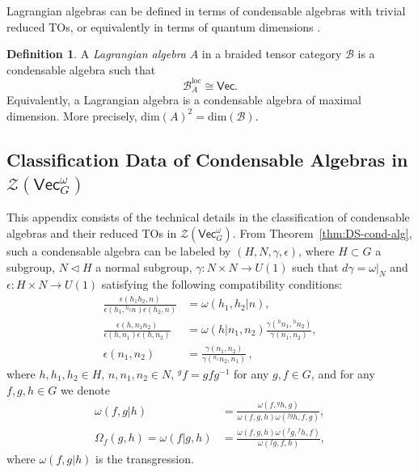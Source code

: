 \documentclass[aps,twocolumn,prx,floatfix,preprintnumbers, nofootinbib,10pt]{revtex4-2}
\numberwithin{equation}{section}
\theoremstyle{definition}
\newtheorem{definition}[theorem]{Definition}
\newcommand{\cB}{\mathcal{B}}
\newcommand{\cZ}{\mathcal{Z}}
\renewcommand{\Vec}{\mathsf{Vec}}
\renewcommand{\dim}{\text{dim}}
\newcommand{\Vect}{\mathsf{Vec}}
\begin{document}
Lagrangian algebras can be defined in terms of condensable algebras with trivial reduced TOs, or equivalently in terms of quantum dimensions \cite{davydov2013witt}.
\begin{definition}
\label{defn:Lagalg}
    A \emph{Lagrangian algebra} $A$ in a braided tensor category $\cB$ is a condensable algebra such that 
    \begin{equation}
        \cB^\text{loc}_{A} \cong \Vect.
    \end{equation}
    Equivalently, a Lagrangian algebra is a condensable algebra of maximal dimension. More precisely, $\dim(A)^2=\dim(\cB)$.
\end{definition}


\subsection{Classification Data of Condensable Algebras in $\cZ(\Vec_G^\omega)$}
This appendix consists of the technical details in the classification of condensable algebras and their reduced TOs in $\cZ(\Vec_G^\omega)$. From Theorem~\ref{thm:DS-cond-alg}, such a condensable algebra can be labeled by $(H, N, \gamma, \epsilon)$, where $H\subset G$ a subgroup, $N\triangleleft H$ a normal subgroup, $\gamma:N\times N \rightarrow U(1)$ such that $d\gamma=\omega|_N$ and $\epsilon:H \times N \rightarrow U(1)$ satisfying the following compatibility conditions:
    \begin{align}
        \frac{\epsilon(h_1h_2,n)}{\epsilon(h_1,{}^{h_2}n)\epsilon(h_2,n)}&=\omega(h_1,h_2|n), \label{eqn:epsilon_relation_transgression}\\
    	\frac{\epsilon(h,n_1n_2)}{\epsilon(h,n_1)\epsilon(h,n_2)} &= \omega(h|n_1,n_2)\frac{\gamma({}^{h}n_1,{}^{h}n_2)}{\gamma(n_1,n_2)},  \label{eqn:epsilon_relation_multiplication}\\
    	\epsilon(n_1,n_2)& = \frac{\gamma(n_1,n_2)}{\gamma({}^{n_1}n_2,n_1)}\,,\label{eps_from_gamma}
    \end{align}
    where $h,h_1,h_2\in H$, $n,n_1,n_2\in N$, ${}^{g}\!f = gfg^{-1}$ for any $g,f\in G$, and for any $f,g,h\in G$ we denote 
    \begin{align} \label{eqn:alpha_proj_action}
    	\omega(f,g|h) & =\frac{\omega(f,{}^{g}h,g)}{\omega(f,g,h)\omega({}^{fg}h,f,g)},\\
        \Omega_f(g,h)=\omega(f|g,h)& =\frac{\omega(f,g,h)\omega({}^{f}\!g,{}^{f}h,f)}{\omega({}^{f}\!g,f,h)}, \label{eq:Omega_f}
    \end{align} 
    where $\omega(f,g|h)$ is the transgression.
\end{document}
